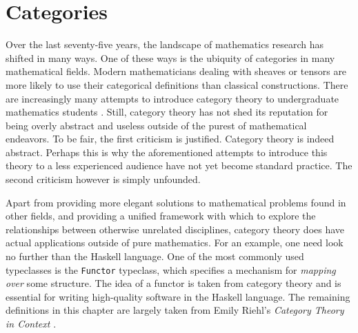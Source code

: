 \documentclass[MS, xcolor=dvipsnames]{wfuthesis}
\theoremstyle{definition}
\begin{document}

\section{Categories}
Over the last seventy-five years, the landscape of mathematics research has shifted in many ways. One of these ways is the ubiquity of categories in many mathematical fields. Modern mathematicians dealing with sheaves or tensors are more likely to use their categorical definitions than classical constructions. There are increasingly many attempts to introduce category theory to undergraduate mathematics students \cite{Aluffi2009}. Still, category theory has not shed its reputation for being overly abstract and useless outside of the purest of mathematical endeavors. To be fair, the first criticism is justified. Category theory is indeed abstract. Perhaps this is why the aforementioned attempts to introduce this theory to a less experienced audience have not yet become standard practice. The second criticism however is simply unfounded. \par
Apart from providing more elegant solutions to mathematical problems found in other fields, and providing a unified framework with which to explore the relationships between otherwise unrelated disciplines, category theory does have actual applications outside of pure mathematics. For an example, one need look no further than the Haskell language. One of the most commonly used typeclasses is the \lstinline{Functor} typeclass, which specifies a mechanism for \emph{mapping over} some structure. The idea of a functor is taken from category theory and is essential for writing high-quality software in the Haskell language. The remaining definitions in this chapter are largely taken from Emily Riehl's \textit{Category Theory in Context} \cite{Riehl2016}.
\end{document}
